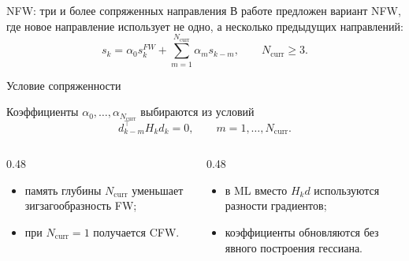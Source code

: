 \documentclass[aspectratio=169,10pt,pdf,hyperref={unicode}]{beamer}
\newcommand{\slideheading}[1]{{\usebeamercolor[fg]{structure}\large #1}}
\begin{document}
\begin{frame}{NFW: три и более сопряженных направления}
\small
\justifying
В работе предложен вариант NFW, где новое направление использует не одно, а несколько
предыдущих направлений:
\[
    s_k
    =
    \alpha_0s_k^{FW}
    +
    \sum_{m=1}^{N_{\mathrm{curr}}}\alpha_ms_{k-m},
    \qquad
    N_{\mathrm{curr}}\geq 3.
\]

\slideheading{Условие сопряженности}

Коэффициенты $\alpha_0,\ldots,\alpha_{N_{\mathrm{curr}}}$ выбираются из условий
\[
    d_{k-m}^{\top}H_kd_k=0,
    \qquad
    m=1,\ldots,N_{\mathrm{curr}}.
\]

\begin{columns}[T,onlytextwidth]
\begin{column}{0.48\textwidth}
\begin{itemize}
    \item память глубины $N_{\mathrm{curr}}$ уменьшает зигзагообразность FW;
    \item при $N_{\mathrm{curr}}=1$ получается CFW.
\end{itemize}
\end{column}
\begin{column}{0.48\textwidth}
\begin{itemize}
    \item в ML вместо $H_kd$ используются разности градиентов;
    \item коэффициенты обновляются без явного построения гессиана.
\end{itemize}
\end{column}
\end{columns}
\end{frame}
\end{document}
